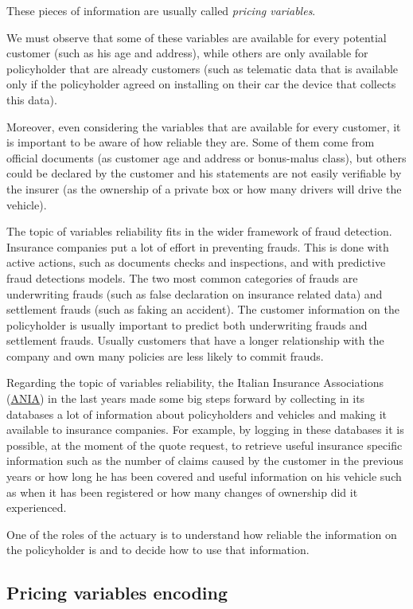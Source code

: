 \documentclass[a4paper, twoside, openright, 12pt]{report}
\theoremstyle{definition}
\theoremstyle{definition}
\theoremstyle{definition}
\theoremstyle{remark}
\begin{document}
These pieces of information are usually called \emph{pricing variables}.

We must observe that some of these variables are available for every potential customer (such as his age and address), while others are only available for policyholder that are already customers (such as telematic data that is available only if the policyholder agreed on installing on their car the device that collects this data).

Moreover, even considering the variables that are available for every customer, it is important to be aware of how reliable they are. Some of them come from official documents (as customer age and address or bonus-malus class), but others could be declared by the customer and his statements are not easily verifiable by the insurer (as the ownership of a private box or how many drivers will drive the vehicle).

The topic of variables reliability fits in the wider framework of fraud detection. Insurance companies put a lot of effort in preventing frauds. This is done with active actions, such as documents checks and inspections, and with predictive fraud detections models. The two most common categories of frauds are underwriting frauds (such as false declaration on insurance related data) and settlement frauds (such as faking an accident). The customer information on the policyholder is usually important to predict both underwriting frauds and settlement frauds. Usually customers that have a longer relationship with the company and own many policies are less likely to commit frauds.

Regarding the topic of variables reliability, the Italian Insurance Associations (\href{https://www.ania.it/}{ANIA}) in the last years made some big steps forward by collecting in its databases a lot of information about policyholders and vehicles and making it available to insurance companies. For example, by logging in these databases it is possible, at the moment of the quote request, to retrieve useful insurance specific information such as the number of claims caused by the customer in the previous years or how long he has been covered and useful information on his vehicle such as when it has been registered or how many changes of ownership did it experienced.

One of the roles of the actuary is to understand how reliable the information on the policyholder is and to decide how to use that information.

\hypertarget{chap:pricing-variables-encoding}{%
\subsection{Pricing variables encoding}\label{chap:pricing-variables-encoding}}
\end{document}
